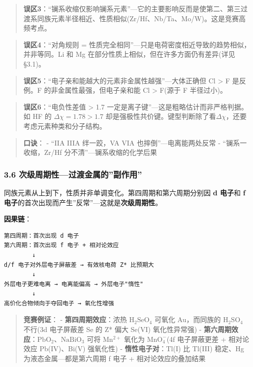 \begin{quote}
\textbf{误区3}：``镧系收缩仅影响镧系元素''---它的主要影响反而是使第二、第三过渡系同族元素半径相近、性质相似(Zr/Hf、Nb/Ta、Mo/W)。这是竞赛高频考点。
\end{quote}

\begin{quote}
\textbf{误区4}：``对角规则 = 性质完全相同''---只是电荷密度相近导致的趋势相似，并非等同。Li 和 Mg 在部分性质上相似，但在许多方面仍有差异(详见 §3.1)。
\end{quote}

\begin{quote}
\textbf{误区5}：``电子亲和能越大的元素非金属性越强''---大体正确但 Cl \textgreater{} F 是反例。F 的非金属性最强，但电子亲和能 Cl \textgreater{} F(源于 F 半径过小)。
\end{quote}

\begin{quote}
\textbf{误区6}：``电负性差值 \textgreater{} 1.7 一定是离子键''---这是粗略估计而非严格判据。如 HF 的 \(\Delta\chi=1.78>1.7\) 却是强极性共价键。键型判断除了看\(\Delta\chi\)，还要考虑元素种类和分子结构。
\end{quote}

\begin{quote}
\textbf{口诀}：
- ``IIA IIIA 绊一跤，VA VIA 也摔倒''---电离能两处反常
- ``镧系一收缩，Zr/Hf 分不清''---镧系收缩的化学后果
\end{quote}

\subsubsection{3.6 次级周期性---过渡金属的''副作用''}\label{ux6b21ux7ea7ux5468ux671fux6027ux8fc7ux6e21ux91d1ux5c5eux7684ux526fux4f5cux7528}

同族元素从上到下，性质并非单调变化。第四周期和第六周期分别因 \textbf{d 电子}和 \textbf{f 电子}的首次出现而产生''反常''---这就是\textbf{次级周期性}。

\textbf{因果链}：

\begin{verbatim}
第四周期：首次出现 d 电子
第六周期：首次出现 f 电子 + 相对论效应
        ↓
d/f 电子对外层电子屏蔽差 → 有效核电荷 Z* 比预期大
        ↓
外层电子更难电离 → 电离能偏高 → 外层电子"惰性"
        ↓
高价化合物倾向于夺回电子 → 氧化性增强
\end{verbatim}

\begin{quote}
\textbf{竞赛例证}：
- \textbf{第四周期效应}：浓热 \(\mathrm{H_2SeO_4}\) 可氧化 Au，而同族的 \(\mathrm{H_2SO_4}\) 不行(3d 电子屏蔽差 \箭 Se 的 Z* 偏大 \箭 Se(VI) 氧化性异常强)
- \textbf{第六周期效应}：\(\mathrm{PbO_2}\)、\(\mathrm{NaBiO_3}\) 可将 \(\mathrm{Mn^{2+}}\) 氧化为 \(\mathrm{MnO_4^-}\)(4f 电子屏蔽更差 + 相对论效应 \箭 Pb(IV)、Bi(V) 强氧化性)
- \textbf{惰性电子对}：Tl(I) 比 Tl(III) 稳定、Hg 为液态金属---都是第六周期 f 电子 + 相对论效应的叠加结果
\end{quote}

